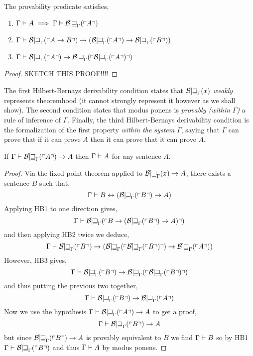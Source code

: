 \documentclass[12pt]{article}
\begin{document}
\begin{lemma}
The provability predicate satisfies,
\begin{enumerate}
\item $\Gamma \proves A \implies \Gamma \proves \Thm{A}$ 
\item $\Gamma \proves \Thm{A \to B} \to (\Thm{A} \to \Thm{B})$
\item $\Gamma \proves \Thm{A} \to \Thm{\Thm{A}}$
\end{enumerate}
\end{lemma}

\begin{proof}
SKETCH THIS PROOF!!!!
\end{proof}

\begin{remark}
The first Hilbert-Bernays derivability condition states that $\Bew_{\Gamma}(x)$ \textit{weakly} represents theoremhood (it cannot strongly represent it however as we shall show). The second condition states that modus ponens is \textit{provably (within $\Gamma$)} a rule of inference of $\Gamma$. Finally, the third Hilbert-Bernays derivability condition is the formalization of the first property \textit{within the system $\Gamma$}, saying that $\Gamma$ can prove that if it can prove $A$ then it can prove that it can prove $A$.  
\end{remark}

\begin{theorem}[L\"{o}b]
If $\Gamma \proves \Thm{A} \to A$ then $\Gamma \proves A$ for any sentence $A$.
\end{theorem}

\begin{proof}
Via the fixed point theorem applied to $\Bew_{\Gamma}(x) \to A$, there exists a sentence $B$ such that,
\[ \Gamma \proves B \leftrightarrow (\Thm{B} \to A) \]
Applying HB1 to one direction gives,
\[ \Gamma \proves \Thm{B \to (\Thm{B} \to A)} \]
and then applying HB2 twice we deduce,
\[ \Gamma \proves \Thm{B} \to (\Thm{\Thm{B}} \to \Thm{A}) \]
However, HB3 gives, 
\[ \Gamma \proves \Thm{B} \to \Thm{\Thm{B}} \]
and thus putting the previous two together,
\[ \Gamma \proves \Thm{B} \to \Thm{A} \]
Now we use the hypothesis $\Gamma \proves \Thm{A} \to A$ to get a proof,
\[ \Gamma \proves \Thm{B} \to A \]
but since $\Thm{B} \to A$ is provably equivalent to $B$ we find $\Gamma \proves B$ so by HB1 $\Gamma \proves \Thm{B}$ and thus $\Gamma \proves A$ by modus ponens. 
\end{proof}
\end{document}
